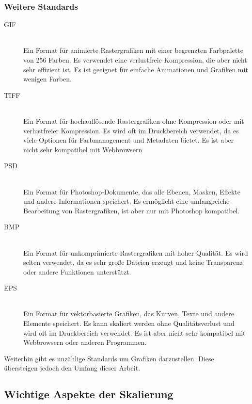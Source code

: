 \subsubsection{Weitere Standards}
\begin{description}
\item[GIF] \\
Ein Format für animierte Rastergrafiken mit einer begrenzten Farbpalette von 256 Farben. Es verwendet eine verlustfreie Kompression, die aber nicht sehr effizient ist. Es ist geeignet für einfache Animationen und Grafiken mit wenigen Farben. \\
\item[TIFF] \\ 
Ein Format für hochauflösende Rastergrafiken ohne Kompression oder mit verlustfreier Kompression. Es wird oft im Druckbereich verwendet, da es viele Optionen für Farbmanagement und Metadaten bietet. Es ist aber nicht sehr kompatibel mit Webbrowsern \\
\item[PSD] \\
Ein Format für Photoshop-Dokumente, das alle Ebenen, Masken, Effekte und andere Informationen speichert. Es ermöglicht eine umfangreiche Bearbeitung von Rastergrafiken, ist aber nur mit Photoshop kompatibel.\\
\item[BMP] \\
Ein Format für unkomprimierte Rastergrafiken mit hoher Qualität. Es wird selten verwendet, da es sehr große Dateien erzeugt und keine Transparenz oder andere Funktionen unterstützt. \\
\item[EPS] \\
Ein Format für vektorbasierte Grafiken, das Kurven, Texte und andere Elemente speichert. Es kann skaliert werden ohne Qualitätsverlust und wird oft im Druckbereich verwendet. Es ist aber nicht sehr kompatibel mit Webbrowsern oder anderen Programmen. \\
\end{description}
Weiterhin gibt es unzählige Standards um Grafiken darzustellen. Diese übersteigen jedoch den Umfang dieser Arbeit.
\subsection{Wichtige Aspekte der Skalierung}
